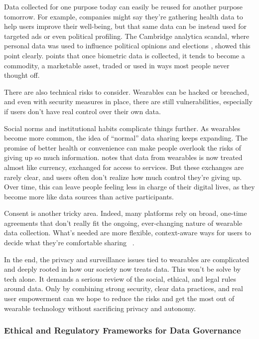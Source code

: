 	Data collected for one purpose today can easily be reused for another purpose tomorrow. For example, companies might say they’re gathering health data to help users improve their well-being, but that same data can be instead used for targeted ads or even political profiling. The Cambridge analytica scandal, where personal data was used to influence political opinions and elections \cite{Kanakia2019}, showed this point clearly. \cite{deOliveira2022} points that once biometric data is collected, it tends to become a commodity, a marketable asset, traded or used in ways most people never thought off. 

	There are also technical risks to consider. Wearables can be hacked or breached, and even with security measures in place, there are still vulnerabilities, especially if users don’t have real control over their own data.

	Social norms and institutional habits complicate things further. As wearables become more common, the idea of “normal” data sharing keeps expanding. The promise of better health or convenience can make people overlook the risks of giving up so much information.\cite{VanDijck2014} notes that data from wearables is now treated almost like currency, exchanged for access to services. But these exchanges are rarely clear, and users often don’t realize how much control they’re giving up. Over time, this can leave people feeling less in charge of their digital lives, as they become more like data sources than active participants.

	Consent is another tricky area. Indeed, many platforms rely on broad, one-time agreements that don’t really fit the ongoing, ever-changing nature of wearable data collection. What’s needed are more flexible, context-aware ways for users to decide what they’re comfortable sharing ~\cite{Riso2017}.

	In the end, the privacy and surveillance issues tied to wearables are complicated and deeply rooted in how our society now treats data. This won't be solve by tech alone. It demands a serious review of the social, ethical, and legal rules around data. Only by combining strong security, clear data practices, and real user empowerment can we hope to reduce the risks and get the most out of wearable technology without sacrificing privacy and autonomy.
	\subsubsection{Ethical and Regulatory Frameworks for Data Governance}

